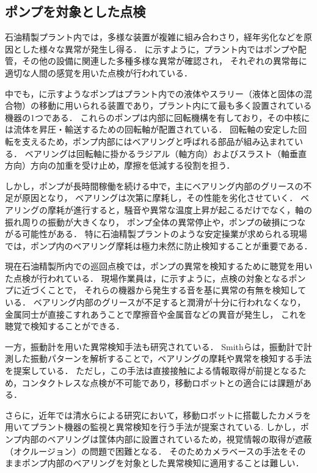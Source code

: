 \documentclass[../main]{subfiles}
\begin{document}
\subsection{ポンプを対象とした点検}
\label{sec:intro_plant_characteristics}


石油精製プラント内では，多様な装置が複雑に組み合わさり，経年劣化などを原因とした様々な異常が発生し得る．
に示すように，プラント内ではポンプや配管，その他の設備に関連した多種多様な異常が確認され，
それぞれの異常毎に適切な人間の感覚を用いた点検が行われている．


中でも，に示すようなポンプはプラント内での液体やスラリー（液体と固体の混合物）の移動に用いられる装置であり，プラント内にて最も多く設置されている機器の1つである．
これらのポンプは内部に回転機構を有しており，その中核には流体を昇圧・輸送するための回転軸が配置されている．
回転軸の安定した回転を支えるため，ポンプ内部にはベアリングと呼ばれる部品が組み込まれている．
ベアリングは回転軸に掛かるラジアル（軸方向）およびスラスト（軸垂直方向）方向の加重を受け止め，摩擦を低減する役割を担う．

しかし，ポンプが長時間稼働を続ける中で，主にベアリング内部のグリースの不足が原因となり，
ベアリングは次第に摩耗し，その性能を劣化させていく．
ベアリングの摩耗が進行すると，騒音や異常な温度上昇が起こるだけでなく，軸の振れ周りの振動が大きくなり，
ポンプ全体の異常停止や，ポンプの破損につながる可能性がある．
特に石油精製プラントのような安定操業が求められる現場では，ポンプ内のベアリング摩耗は極力未然に防止検知することが重要である．

現在石油精製所内での巡回点検では，ポンプの異常を検知するために聴覚を用いた点検が行われている．
現場作業員は，に示すように，点検の対象となるポンプに近づくことで，
それらの機器から発生する音を基に異常の有無を検知している．
ベアリング内部のグリースが不足すると潤滑が十分に行われなくなり，金属同士が直接こすれあうことで摩擦音や金属音などの異音が発生し，
これを聴覚で検知することができる．

一方，振動計を用いた異常検知手法も研究されている\cite{SMITH2015100}．
Smithらは，振動計で計測した振動パターンを解析することで，ベアリングの摩耗や異常を検知する手法を提案している．
ただし，この手法は直接接触による情報取得が前提となるため，コンタクトレスな点検が不可能であり，移動ロボットとの適合には課題がある．



さらに，近年では清水らによる研究において，移動ロボットに搭載したカメラを用いてプラント機器の監視と異常検知を行う手法が提案されている\cite{shimizu2024change}.
しかし，ポンプ内部のベアリングは筐体内部に設置されているため，視覚情報の取得が遮蔽（オクルージョン）の問題で困難となる．
そのためカメラベースの手法をそのままポンプ内部のベアリングを対象とした異常検知に適用することは難しい．
\end{document}
